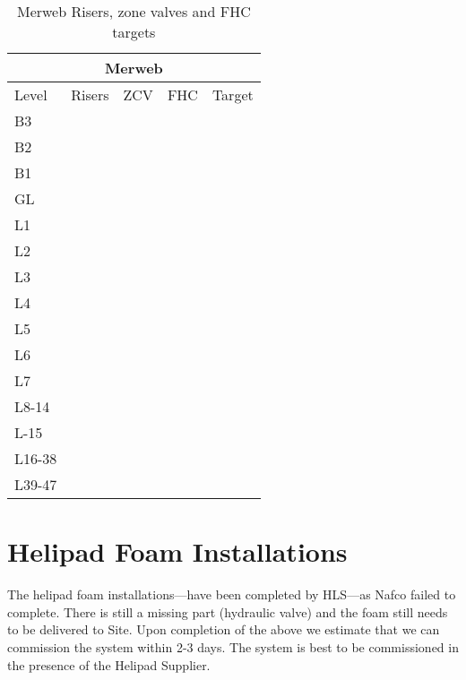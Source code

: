 \begin{table}[htbp]\label{fire3}
\begin{center}
\begin{tabular}{lllll}
\toprule
\multicolumn{5}{c}{Merweb}\\
\midrule
Level	&Risers &ZCV	&FHC  &Target\\
\midrule
B3	&\checkmark     &\checkmark	 &\checkmark  &\\
B2	&\checkmark     &\checkmark	 &\checkmark  &\\
B1	&\checkmark     &\checkmark	 &\checkmark  &\\
GL	&\checkmark     &\checkmark	 &\checkmark  &\\
L1	&\checkmark     &\checkmark	 &\checkmark  &\\
L2	&\checkmark     &\checkmark	 &\checkmark  &\\
L3	&\checkmark     &\checkmark	 &\checkmark  &\\
L4	&\checkmark     &\checkmark	 &\checkmark  &\\
L5	&\checkmark     &\checkmark	 &\checkmark  &\\
L6	&\checkmark     &\checkmark	 &\checkmark  &\\
L7	&\checkmark     &\checkmark	 &\checkmark  &\\
\midrule
L8-14	&\checkmark     &\checkmark	 &\checkmark  &\\
L-15	&\checkmark     &\checkmark	 &\checkmark  &\\
L16-38	&\checkmark     &\checkmark	 &\checkmark  &\\
L39-47	&\checkmark     &\checkmark	 &\checkmark  &\\
\bottomrule
\end{tabular}
\caption{Merweb Risers, zone valves and FHC targets}
\end{center}
\end{table}

\section{Helipad Foam Installations}

The helipad foam installations---have been completed by HLS---as Nafco failed to complete. There is still a missing part (hydraulic valve) and the foam still needs to be delivered to Site. Upon completion of the above we estimate that we can commission the system within 2-3 days. The system is best to be commissioned in the presence of the Helipad Supplier.



